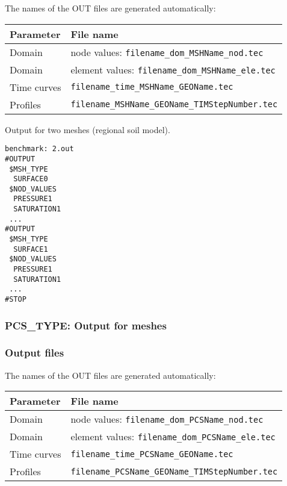 {The names of the OUT files are generated automatically:

\begin{tabular*}{12.773cm}{|p{}|p{8.9cm}|} \hline
Parameter          & File name \\ \hline \hline
%
Domain      & node values: \texttt{filename\_dom\_MSHName\_nod.tec} \\
Domain      & element values: \texttt{filename\_dom\_MSHName\_ele.tec} \\
Time curves & \texttt{filename\_time\_MSHName\_GEOName.tec} \\
Profiles    & \texttt{filename\_MSHName\_GEOName\_TIMStepNumber.tec} \\
\hline
\end{tabular*}

Output for two meshes (regional soil model).

\begin{verbatim}
benchmark: 2.out
#OUTPUT
 $MSH_TYPE
  SURFACE0
 $NOD_VALUES
  PRESSURE1
  SATURATION1
 ...
#OUTPUT
 $MSH_TYPE
  SURFACE1
 $NOD_VALUES
  PRESSURE1
  SATURATION1
 ...
#STOP
\end{verbatim}


\subsubsection{PCS\_TYPE: Output for meshes}

\subsubsection*{Output files}

The names of the OUT files are generated automatically:

\begin{tabular*}{12.773cm}{|p{}|p{8.9cm}|} \hline
Parameter          & File name \\ \hline \hline
%
Domain      & node values: \texttt{filename\_dom\_PCSName\_nod.tec} \\
Domain      & element values: \texttt{filename\_dom\_PCSName\_ele.tec} \\
Time curves & \texttt{filename\_time\_PCSName\_GEOName.tec} \\
Profiles    & \texttt{filename\_PCSName\_GEOName\_TIMStepNumber.tec} \\
\hline
\end{tabular*}


}

